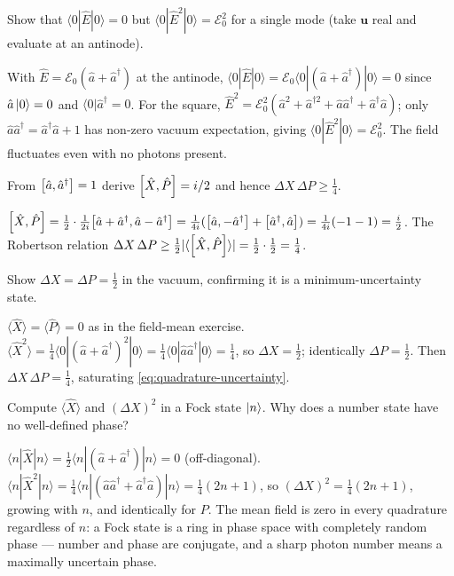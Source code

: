 \begin{exercise}
Show that $\langle0|\hat E|0\rangle=0$ but
$\langle0|\hat E^2|0\rangle=\mathcal E_0^2$ for a single mode (take
$\bm u$ real and evaluate at an antinode).
\begin{solution}
With $\hat E=\mathcal E_0(\hat a+\hat a^\dagger)$ at the antinode,
$\langle0|\hat E|0\rangle=\mathcal E_0\langle0|(\hat a+\hat a^\dagger)|0\rangle=0$
since $\hat a\ket0=0$ and $\langle0|\hat a^\dagger=0$. For the
square, $\hat E^2=\mathcal E_0^2(\hat a^2+\hat a^{\dagger2}+\hat a\hat a^\dagger+\hat a^\dagger\hat a)$;
only $\hat a\hat a^\dagger=\hat a^\dagger\hat a+1$ has non-zero vacuum
expectation, giving $\langle0|\hat E^2|0\rangle=\mathcal E_0^2$. The
field fluctuates even with no photons present.
\end{solution}
\end{exercise}

\begin{exercise}
From $\comm{\hat a}{\hat a^\dagger}=1$ derive
$\comm{\hat X}{\hat P}=i/2$ and hence
$\Delta X\,\Delta P\geq\tfrac14$.
\begin{solution}
$\comm{\hat X}{\hat P}=\tfrac{1}{2}\cdot\tfrac{1}{2i}\comm{\hat a+\hat a^\dagger}{\hat a-\hat a^\dagger}
=\tfrac1{4i}(\comm{\hat a}{-\hat a^\dagger}+\comm{\hat a^\dagger}{\hat a})
=\tfrac1{4i}(-1-1)=\tfrac{i}{2}$.
The Robertson relation $\Delta X\,\Delta P\geq\tfrac12|\langle\comm{\hat X}{\hat P}\rangle|=\tfrac12\cdot\tfrac12=\tfrac14$.
\end{solution}
\end{exercise}

\begin{exercise}
Show $\Delta X=\Delta P=\tfrac12$ in the vacuum, confirming it is a
minimum-uncertainty state.
\begin{solution}
$\langle\hat X\rangle=\langle\hat P\rangle=0$ as in the field-mean
exercise. $\langle\hat X^2\rangle=\tfrac14\langle0|(\hat a+\hat a^\dagger)^2|0\rangle=\tfrac14\langle0|\hat a\hat a^\dagger|0\rangle=\tfrac14$,
so $\Delta X=\tfrac12$; identically $\Delta P=\tfrac12$. Then
$\Delta X\,\Delta P=\tfrac14$, saturating \cref{eq:quadrature-uncertainty}.
\end{solution}
\end{exercise}

\begin{exercise}
Compute $\langle\hat X\rangle$ and $(\Delta X)^2$ in a Fock state
$\ket n$. Why does a number state have no well-defined phase?
\begin{solution}
$\langle n|\hat X|n\rangle=\tfrac12\langle n|(\hat a+\hat a^\dagger)|n\rangle=0$
(off-diagonal). $\langle n|\hat X^2|n\rangle=\tfrac14\langle n|(\hat a\hat a^\dagger+\hat a^\dagger\hat a)|n\rangle=\tfrac14(2n+1)$,
so $(\Delta X)^2=\tfrac14(2n+1)$, growing with $n$, and identically
for $P$. The mean field is zero in every quadrature regardless of
$n$: a Fock state is a ring in phase space with completely random
phase --- number and phase are conjugate, and a sharp photon number
means a maximally uncertain phase.
\end{solution}
\end{exercise}

